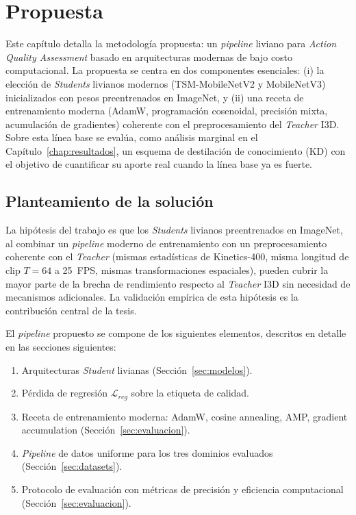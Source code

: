 \chapter{Propuesta}
\label{cap:propuesta}
Este capítulo detalla la metodología propuesta: un \textit{pipeline} liviano para \textit{Action Quality Assessment} basado en arquitecturas modernas de bajo costo computacional. La propuesta se centra en dos componentes esenciales: (i) la elección de \textit{Students} livianos modernos (\ac{TSM}-MobileNetV2 y MobileNetV3) inicializados con pesos preentrenados en ImageNet, y (ii) una receta de entrenamiento moderna (AdamW, programación cosenoidal, precisión mixta, acumulación de gradientes) coherente con el preprocesamiento del \textit{Teacher} \ac{I3D}. Sobre esta línea base se evalúa, como análisis marginal en el Capítulo~\ref{chap:resultados}, un esquema de destilación de conocimiento (\ac{KD}) con el objetivo de cuantificar su aporte real cuando la línea base ya es fuerte.

\section{Planteamiento de la solución}

La hipótesis del trabajo es que los \textit{Students} livianos preentrenados en ImageNet, al combinar un \textit{pipeline} moderno de entrenamiento con un preprocesamiento coherente con el \textit{Teacher} (mismas estadísticas de Kinetics-400, misma longitud de clip $T=64$ a 25~FPS, mismas transformaciones espaciales), pueden cubrir la mayor parte de la brecha de rendimiento respecto al \textit{Teacher} \ac{I3D} sin necesidad de mecanismos adicionales. La validación empírica de esta hipótesis es la contribución central de la tesis.

El \textit{pipeline} propuesto se compone de los siguientes elementos, descritos en detalle en las secciones siguientes:

\begin{enumerate}
    \item Arquitecturas \textit{Student} livianas (Sección~\ref{sec:modelos}).
    \item Pérdida de regresión $\mathcal{L}_{reg}$ sobre la etiqueta de calidad.
    \item Receta de entrenamiento moderna: AdamW, cosine annealing, AMP, gradient accumulation (Sección~\ref{sec:evaluacion}).
    \item \textit{Pipeline} de datos uniforme para los tres dominios evaluados (Sección~\ref{sec:datasets}).
    \item Protocolo de evaluación con métricas de precisión y eficiencia computacional (Sección~\ref{sec:evaluacion}).
\end{enumerate}

